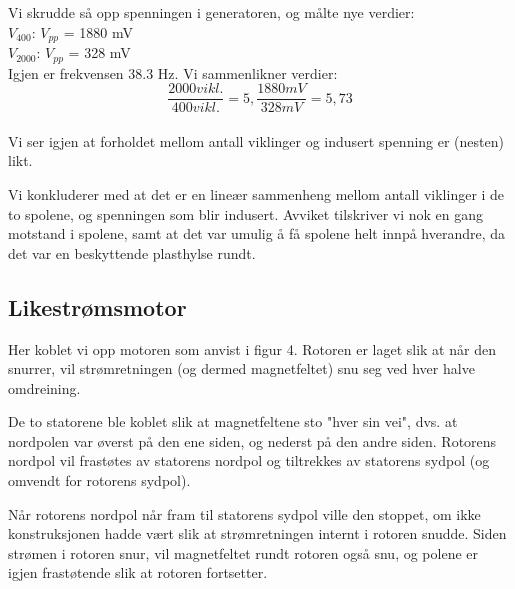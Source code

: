 \documentclass[12pt,norsk,a4paper]{article}
\begin{document}
Vi skrudde så opp spenningen i generatoren, og målte nye verdier:\\

$V_{400}$: $V_{pp}$ = 1880 mV\\

$V_{2000}$: $V_{pp}$ = 328 mV\\

Igjen er frekvensen 38.3 Hz. Vi sammenlikner verdier:\\

\begin{equation}
    \label{eq:viklinger2}
    \frac{2000 vikl. }{400 vikl. } = 5 , \frac{1880 mV}{328 mV} = 5,73
\end{equation}\\


Vi ser igjen at forholdet mellom antall viklinger og indusert spenning er (nesten) likt.

Vi konkluderer med at det er en lineær sammenheng mellom antall viklinger i de to spolene, og spenningen som blir indusert. Avviket tilskriver vi nok en gang motstand i spolene, samt at det var umulig å få spolene helt innpå hverandre, da det var en beskyttende plasthylse rundt.

\clearpage
\subsection{Likestrømsmotor}
Her koblet vi opp motoren som anvist i figur 4.
Rotoren er laget slik at når den snurrer, vil strømretningen (og dermed magnetfeltet) snu seg ved hver halve omdreining.

De to statorene ble koblet slik at magnetfeltene sto "hver sin vei", dvs. at nordpolen var øverst på den ene siden, og nederst på den andre siden.
Rotorens nordpol vil frastøtes av statorens nordpol og tiltrekkes av statorens sydpol (og omvendt for rotorens sydpol).

 Når rotorens nordpol når fram til statorens sydpol ville den stoppet, om ikke konstruksjonen hadde vært slik at strømretningen internt i rotoren snudde. Siden strømen i rotoren snur, vil magnetfeltet rundt rotoren også snu, og polene er igjen frastøtende slik at rotoren fortsetter.
\end{document}
